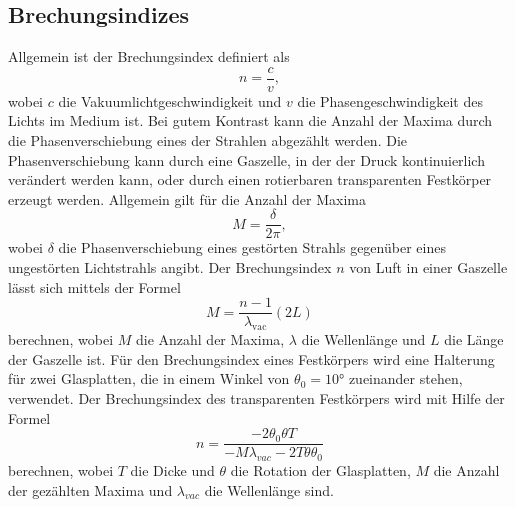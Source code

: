 \subsection{Brechungsindizes}
Allgemein ist der Brechungsindex definiert als
\begin{equation*}
  n = \frac{c}{v},
\end{equation*}
wobei $c$ die Vakuumlichtgeschwindigkeit und $v$ die Phasengeschwindigkeit des Lichts im Medium ist.
Bei gutem Kontrast kann die Anzahl der Maxima durch die Phasenverschiebung eines
der Strahlen abgezählt werden. Die Phasenverschiebung kann durch eine Gaszelle,
in der der Druck kontinuierlich verändert werden kann, oder durch einen rotierbaren
transparenten Festkörper erzeugt werden.
Allgemein gilt für die Anzahl der Maxima
\begin{equation*}
  M = \frac{\delta}{2\pi},
\end{equation*}
wobei $\delta$ die Phasenverschiebung eines gestörten Strahls gegenüber eines
ungestörten Lichtstrahls angibt.
Der Brechungsindex $n$ von Luft in einer Gaszelle lässt sich mittels der Formel
\begin{equation}
  M = \frac{n-1}{\lambda_{\text{vac}}}(2L)
  \label{eqn:brechluft}
\end{equation}
berechnen,
wobei $M$ die Anzahl der Maxima, $\lambda$ die Wellenlänge und $L$ die Länge der Gaszelle ist.
Für den Brechungsindex eines Festkörpers wird eine Halterung für zwei Glasplatten,
die in einem Winkel von $\theta_0 = 10°$ zueinander stehen, verwendet.
Der Brechungsindex des transparenten Festkörpers wird mit Hilfe der Formel
\begin{equation}
  n = \frac{-2 \theta_0\theta T}{- M\lambda_{vac} - 2 T\theta\theta_0}
\end{equation}
berechnen, wobei $T$ die Dicke und $\theta$ die Rotation der Glasplatten, $M$ die
Anzahl der gezählten Maxima und $\lambda_{vac}$ die Wellenlänge sind.
